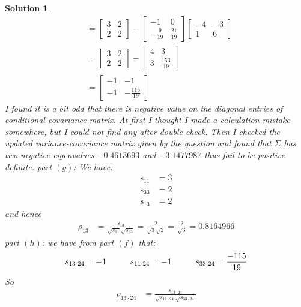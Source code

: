 \documentclass[11pt]{article}
\newtheorem{sol}{Solution}
\begin{document}
\begin{sol}
\begin{align*}
		&= \left[\begin{array}{cc} 3&2 \\ 2& 2\end{array}\right]  - \left[\begin{array}{cc}-1&0 \\-\frac{9}{19}& \frac{21}{19} \end{array}\right]\left[\begin{array}{cc}-4 &-3 \\ 1& 6\end{array}\right]\\
		&=  \left[\begin{array}{cc} 3&2 \\ 2& 2\end{array}\right] - \left[\begin{array}{cc}4& 3\\ 3& \frac{153}{19}\end{array}\right]\\
		&= \left[\begin{array}{cc}-1& -1\\ -1& -\frac{115}{19}\end{array}\right]
	\end{align*}
	I found it is a bit odd that there is negative value on the diagonal entries of conditional covariance matrix. At first I thought I made a calculation mistake somewhere, but I could not find any after double check. Then I checked the updated variance-covariance matrix given by the question and found that $\Sigma$ has two negative eigenvalues $-0.4613693$ and $-3.1477987$ thus fail to be positive definite. \vskip 2mm
	part $(g)$:\vskip 2mm
	We have:
	\begin{align*}
		\text{s}_{11} &=3 \\
		\text{s}_{33} &= 2\\
		\text{s}_{13} &= 2
	\end{align*}
	and hence
	\begin{align*}
		\rho_{13} &= \frac{s_{13}}{\sqrt{s_{11}}\sqrt{s_{33}}} = \frac{2}{\sqrt{3}\sqrt{2}} = \frac{2}{\sqrt{6}} = 0.8164966
	\end{align*}
	part $(h)$:\vskip 2mm
	we have from part $(f)$ that:
	\begin{align*}
		s_{13\cdot 24} = -1 \hskip 1cm s_{11\cdot 24} = -1 \hskip 1cm s_{33\cdot 24} = \frac{-115}{19}
	\end{align*}
	So 
	\begin{align*}
		\rho_{13\cdot 24} &= \frac{s_{13\cdot 24}}{\sqrt{s_{11\cdot 24}}\sqrt{s_{33\cdot 24}}}\\

\end{align*}
\end{sol}
\end{document}
